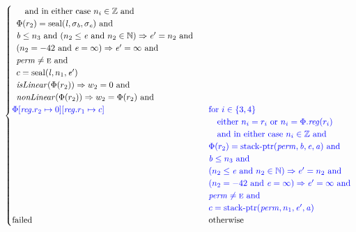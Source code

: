 \documentclass[a4paper]{article}
\newcommand{\tand}{\text{ and }}
\newcommand{\totherwise}{\text{otherwise }}
\newcommand{\sourcecolor}[1]{\color{blue}}
\newcommand{\src}[1]{{\sourcecolor{} #1}}
\newcommand{\nats}{\mathbb{N}}
\newcommand{\ints}{\mathbb{Z}}
\newcommand{\update}[2]{[#1 \mapsto #2]}
\newcommand{\updReg}[2]{\update{\reg.#1}{#2}}
\newcommand{\shareddom}[1]{\mathrm{#1}}
\newcommand{\perm}{\var{perm}}
\newcommand{\lin}{\var{l}}
\newcommand{\stkptr}[1]{\mathrm{stack\text{-}ptr}(#1)}
\newcommand{\seal}[1]{\shareddom{seal}(#1)}
\newcommand{\failed}{\mathrm{failed}}
\newcommand{\var}[1]{\mathit{#1}}
\newcommand{\reg}{\var{reg}}
\newcommand{\baddr}{\var{b}}
\newcommand{\eaddr}{\var{e}}
\newcommand{\aaddr}{\var{a}}
\newcommand{\plainperm}[1]{\textsc{#1}}
\newcommand{\enter}{\plainperm{e}}
\newcommand{\plainfun}[2]{
  \ifthenelse{\equal{#2}{}}
  {\mathit{#1}}
  {\mathit{#1}(#2)}
}
\newcommand{\nonLinear}[1]{\plainfun{nonLinear}{#1}}
\newcommand{\isLinear}[1]{\plainfun{isLinear}{#1}}
\begin{document}
\begin{align*}
\begin{cases}
\begin{array}[t]{l}
                                                   \quad \text{and in either case $n_i \in \ints$ and} \\
                                                   \Phi(r_2) = \seal{\lin,\sigma_\baddr,\sigma_\eaddr} \tand \\
                                                   \baddr \leq n_3 \tand 
                                                   (n_2 \leq \eaddr \tand n_2 \in \nats) \Rightarrow \eaddr' = n_2 \tand \\
                                                   (n_2 = -42 \tand \eaddr = \infty) \Rightarrow \eaddr' = \infty \tand\\
                                                   \perm \neq \enter \tand\\
                                                   c = \seal{\lin,n_1,\eaddr'}\\
                                                   \isLinear{\Phi(r_2)} \Rightarrow w_2 = 0 \tand \\
                                                   \nonLinear{\Phi(r_2)} \Rightarrow w_2 = \Phi(r_2) \tand
                                                 \end{array}
\\
                                                 \src{\Phi\updReg{r_2}{0}\updReg{r_1}{c}} &
                                                 \arraycolsep=0pt
                                                 \begin{array}[t]{l}
                                                   \src{\text{for $i \in \{3, 4\}$ }} \\
                                                   \quad \src{\text{either $n_i = r_i$ or $n_i = \Phi.\reg(r_i)$}}\\
                                                   \quad \src{\text{and in either case $n_i \in \ints$ and}} \\
                                                   \src{\Phi(r_2) = \stkptr{\perm,\baddr,\eaddr,\aaddr} \tand} \\
                                                   \src{\baddr \leq n_3 \tand } \\
                                                   \src{(n_2 \leq \eaddr \tand n_2 \in \nats) \Rightarrow \eaddr' = n_2 \tand }\\
                                                   \src{(n_2 = -42 \tand \eaddr = \infty) \Rightarrow \eaddr' = \infty \tand}\\
                                                   \src{\perm \neq \enter \tand}\\
                                                   \src{c = \stkptr{\perm,n_1,\eaddr',\aaddr}}\\
                                                 \end{array}\\
                                                 \failed & \totherwise 
                                               \end{cases}
\end{align*}
\end{document}
